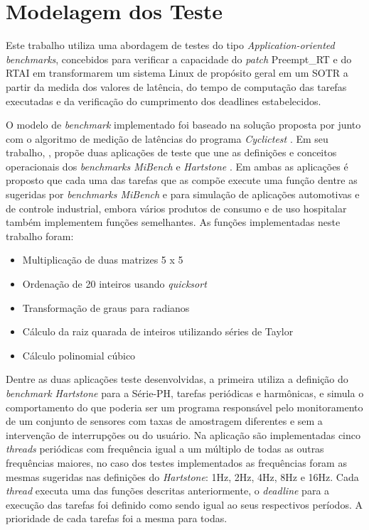 \section{Modelagem dos Teste}
Este trabalho utiliza uma abordagem de testes do tipo \textit{Application-oriented benchmarks}, concebidos para verificar a capacidade do \textit{patch} Preempt\_RT e do RTAI em transformarem um sistema Linux de propósito geral em um SOTR a partir da medida dos valores de latência, do tempo de computação das tarefas executadas e da verificação do cumprimento dos deadlines estabelecidos.

O modelo de \textit{benchmark} implementado foi baseado na solução proposta por \cite{Anderson2007} junto com o algoritmo de medição de latências do programa \textit{Cyclictest} \cite{LinuxCyclictest2017}. Em seu trabalho, \cite{Anderson2007}, propõe duas aplicações de teste que une as definições e conceitos operacionais dos \textit{benchmarks MiBench} \cite{mibench2001} e \textit{Hartstone} \cite{hartstone1992}. Em ambas as aplicações é proposto que cada uma das tarefas que as compõe execute uma função dentre as sugeridas por \textit{benchmarks MiBench} e \cite{Anderson2007} para simulação de aplicações automotivas e de controle industrial, embora vários produtos de consumo e de uso hospitalar também implementem funções semelhantes. As funções implementadas neste trabalho foram:

\begin{itemize}
   \item Multiplicação de duas matrizes 5 x 5
   \item Ordenação de 20 inteiros usando \textit{quicksort}
   \item Transformação de graus para radianos
   \item Cálculo da raiz quarada de inteiros utilizando séries de Taylor
   \item Cálculo polinomial cúbico
\end{itemize}

Dentre as duas aplicações teste desenvolvidas, a primeira utiliza a definição do \textit{benchmark Hartstone} para a Série-PH, tarefas periódicas e harmônicas, e simula o comportamento do que poderia ser um programa responsável pelo monitoramento de um conjunto de sensores com taxas de amostragem diferentes e sem a intervenção de interrupções ou do usuário. Na aplicação são implementadas cinco \textit{threads} periódicas com frequência igual a um múltiplo de todas as outras frequências maiores, no caso dos testes implementados as frequências foram as mesmas sugeridas nas definições do \textit{Hartstone}: 1Hz, 2Hz, 4Hz, 8Hz e 16Hz. Cada \textit{thread} executa uma das funções descritas anteriormente, o \textit{deadline} para a execução das tarefas foi definido como sendo igual ao seus respectivos períodos. A prioridade de cada tarefas foi a mesma para todas. 

